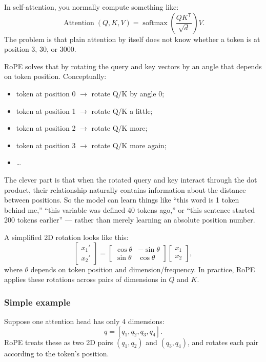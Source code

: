 In self-attention, you normally compute something like:
\[
  \operatorname{Attention}(Q,K,V)
  =\operatorname{softmax}\!\left(\frac{QK^{\mathsf T}}{\sqrt{d}}\right)V.
\]
The problem is that plain attention by itself does not know whether a token
is at position 3, 30, or 3000.

RoPE solves that by rotating the query and key vectors by an angle that
depends on token position. Conceptually:
\begin{itemize}
    \setlength{\itemsep}{0pt}
  \item token at position 0 $\rightarrow$ rotate Q/K by angle 0;
  \item token at position 1 $\rightarrow$ rotate Q/K a little;
  \item token at position 2 $\rightarrow$ rotate Q/K more;
  \item token at position 3 $\rightarrow$ rotate Q/K more again;
  \item \ldots
\end{itemize}
The clever part is that when the rotated query and key interact through the
dot product, their relationship naturally contains information about the
distance between positions. So the model can learn things like ``this word
is 1 token behind me,'' ``this variable was defined 40 tokens ago,'' or
``this sentence started 200 tokens earlier'' --- rather than merely learning
an absolute position number.

A simplified 2D rotation looks like this:
\[
  \begin{bmatrix} x_1' \\ x_2'
  \end{bmatrix}
  =
  \begin{bmatrix}
    \cos\theta & -\sin\theta \\
    \sin\theta & \cos\theta
  \end{bmatrix}
  \begin{bmatrix} x_1 \\ x_2
  \end{bmatrix},
\]
where \(\theta\) depends on token position and dimension/frequency. In
practice, RoPE applies these rotations across pairs of dimensions in \(Q\) and
\(K\).

\subsubsection{Simple example}

Suppose one attention head has only 4 dimensions:
\[
  q=[q_1,q_2,q_3,q_4].
\]
RoPE treats these as two 2D pairs \((q_1,q_2)\) and \((q_3,q_4)\), and rotates
each pair according to the token's position.

